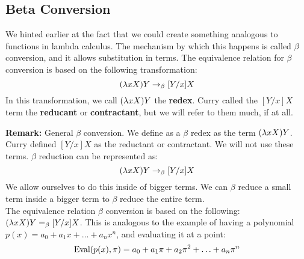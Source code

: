 \subsection{Beta Conversion}
We hinted earlier at the fact that we could create something analogous to functions in lambda calculus. The mechanism by which this happens is called $\beta$ conversion, and it allows substitution in terms. The equivalence relation for $\beta$ conversion is based on the following transformation:
\begin{equation*}
  (\lambda xX)Y \rightarrow_\beta [Y/x]X
\end{equation*}
In this transformation, we call $(\lambda xX)Y$ the \textbf{redex}. Curry called the $[Y/x]X$ term the \textbf{reducant} or \textbf{contractant}, but we will refer to them much, if at all.

\textbf{Remark:} General $\beta$ conversion. We define as a $\beta$ redex as the term $(\lambda xX)Y$. Curry defined $[Y /x]X$ as the reductant or contractant. We will not use these terms. $\beta$ reduction can be represented as:
\begin{equation*}
  (\lambda xX)Y \rightarrow_\beta [Y / x]X
\end{equation*}
We allow ourselves to do this inside of bigger terms. We can $\beta$ reduce a small term inside a bigger term to $\beta$ reduce the entire term.\\

The equivalence relation $\beta$ conversion is based on the following: $(\lambda xX)Y =_\beta [Y / x]X$. This is analogous to the example of having a polynomial $p(x) = a_0 + a_1x + \ldots + a_nx^n$, and evaluating it at a point:
\begin{equation*}
  \hbox{Eval}(p(x),\pi) = a_0 + a_1\pi + a_2\pi^2 + \ldots + a_n\pi^n
\end{equation*}